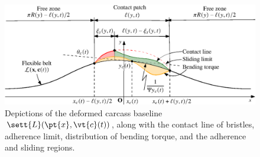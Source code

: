 
\begin{figure}[htb]
  \centering
  \includegraphics[width=0.8\linewidth]{./figures/appendix_3/contact_patch}
  \caption{Depictions of the deformed carcass baseline $\sett{L}(\pt{x}, \vt{c}(t))$, along with the contact line of bristles, adherence limit, distribution of bending torque, and the adherence and sliding regions.}
  \label{app3:fig:contact_patch}
\end{figure}

